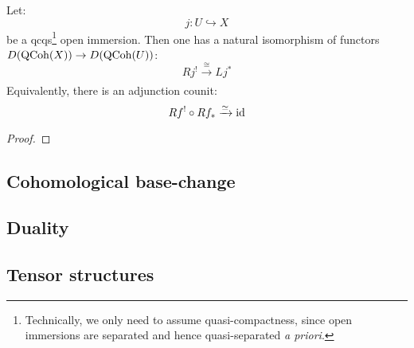         \begin{theorem} \label{theorem: extending_qcoh_from_qc_open_subschemes}
            Let:
                $$j: U \hookrightarrow X$$
            be a qcqs\footnote{Technically, we only need to assume quasi-compactness, since open immersions are separated and hence quasi-separated \textit{a priori}.} open immersion. Then one has a natural isomorphism of functors $D(\mathrm{QCoh}(X)) \to D(\mathrm{QCoh}(U))$:
                $$Rj^! \xrightarrow[]{\cong} Lj^*$$
            Equivalently, there is an adjunction counit:
                $$Rf^! \circ Rf_* \xrightarrow[]{\simeq} \mathrm{id}$$
        \end{theorem}
            \begin{proof}
                
            \end{proof}

    \subsection{Cohomological base-change}

    \subsection{Duality}

    \subsection{Tensor structures}